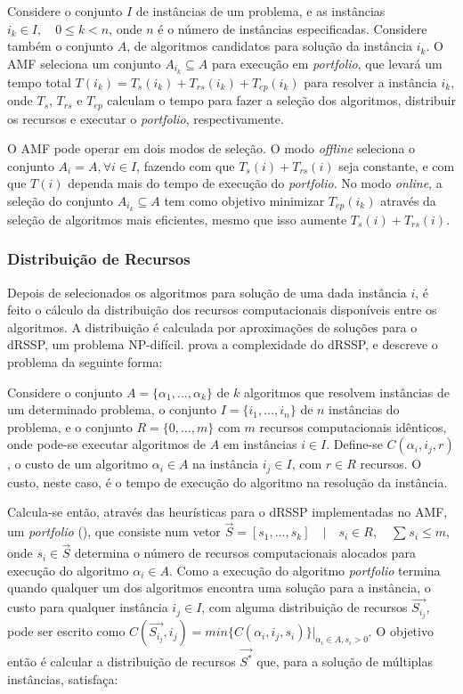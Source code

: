 \documentclass[a4paper, 11pt]{article}
\begin{document}
Considere o conjunto $I$ de instâncias de um problema, e as instâncias $i_k \in
I, \quad 0 \leq k < n$, onde $n$ é o número de instâncias especificadas. 
Considere também o conjunto $A$, de algoritmos candidatos para solução da
instância $i_k$. O AMF seleciona um conjunto $A_{i_k} \subseteq A$ para
execução em \emph{portfolio}, que levará um tempo total $T(i_k) = 
T_s(i_k) + T_{rs}(i_k) + T_{ep}(i_k)$ para resolver a instância $i_k$,
onde $T_s$, $T_{rs}$ e $T_{ep}$ calculam o tempo para fazer a seleção
dos algoritmos, distribuir os recursos e executar o \emph{portfolio},
respectivamente.

O AMF pode operar em dois modos de seleção. O modo \emph{offline}
seleciona o conjunto $A_{i} = A, \forall i \in I$, fazendo com que
$T_s(i) + T_{rs}(i)$ seja constante, e com que $T(i)$ dependa mais
do tempo de execução do \emph{portfolio}. No modo \emph{online},
a seleção do conjunto $A_{i_k} \subseteq A$ tem como objetivo minimizar
$T_{ep}(i_k)$ através da seleção de algoritmos mais eficientes, mesmo
que isso aumente $T_s(i) + T_{rs}(i)$.

\subsubsection{Distribuição de Recursos} \label{sec:drssp}

Depois de selecionados os algoritmos para solução de uma dada instância $i$,
é feito o cálculo da distribuição dos recursos computacionais disponíveis entre
os algoritmos. A distribuição é calculada por aproximações de soluções para
o dRSSP, um problema NP-difícil. \citet{bougeret2011approximating} prova a 
complexidade do dRSSP, e descreve o problema da seguinte forma:

Considere o conjunto $A = \{\alpha_1, \dots, \alpha_k\}$ de $k$ algoritmos que
resolvem instâncias de um determinado problema, o conjunto $I = \{i_1, \dots, 
i_n\}$ de $n$ instâncias do problema, e o conjunto $R = \{0, \dots, m\}$ com
$m$ recursos computacionais idênticos, onde pode-se executar algoritmos de $A$
em instâncias $i \in I$. Define-se $C(\alpha_i,i_j,r)$, o custo
de um algoritmo $\alpha_i \in A$ na instância $i_j \in I$, com $r \in R$ 
recursos. O custo, neste caso, é o tempo de execução do 
algoritmo na resolução da instância.

Calcula-se então, através das heurísticas para o dRSSP implementadas no AMF,
um \emph{portfolio} (\citet{huberman1997economics}),
que consiste num vetor $\overrightarrow{S} = [s_1, \dots, s_k] \quad | \quad 
s_i \in R, \quad \sum_{} s_i \leq m$, onde $s_i \in \overrightarrow{S}$ 
determina o número de recursos computacionais alocados para execução
do algoritmo $\alpha_i \in A$. Como a execução do algoritmo 
\emph{portfolio} termina quando qualquer um dos algoritmos encontra
uma solução para a instância, o custo para qualquer instância
$i_j \in I$, com alguma distribuição de recursos $\overrightarrow{S_{i_j}}$,
pode ser escrito como $C(\overrightarrow{S_{i_j}}, i_j) = 
min \{C(\alpha_i,i_j,s_i)\}|_{\alpha_i \in A, s_i > 0}$. O objetivo
então é calcular a distribuição de recursos $\overrightarrow{S^*}$ 
que, para a solução de múltiplas instâncias, satisfaça:
\end{document}
